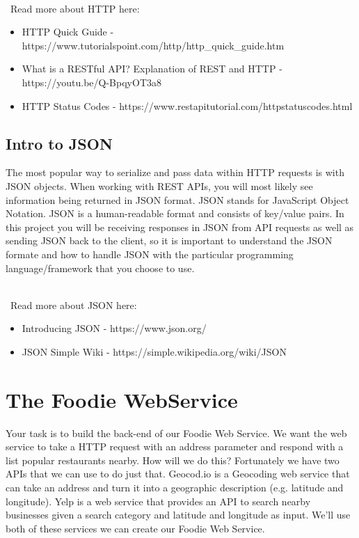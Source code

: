 \documentclass{article}
\begin{document}
\-\\\ Read more about HTTP here:
\begin{itemize}
\item HTTP Quick Guide - https://www.tutorialspoint.com/http/http\_quick\_guide.htm
\item What is a RESTful API? Explanation of REST and HTTP - https://youtu.be/Q-BpqyOT3a8
\item HTTP Status Codes - https://www.restapitutorial.com/httpstatuscodes.html
\end{itemize}

\subsection*{Intro to JSON}
The most popular way to serialize and pass data within HTTP requests is with JSON objects. When working with REST APIs, you will most likely see information being returned in JSON format. JSON stands for JavaScript Object Notation. JSON is a human-readable format and consists of key/value pairs. In this project you will be receiving responses in JSON from API requests as well as sending JSON back to the client, so it is important to understand the JSON formate and how to handle JSON with the particular programming language/framework that you choose to use. 

\-\\\ Read more about JSON here:
\begin{itemize}
\item Introducing JSON - https://www.json.org/
\item JSON Simple Wiki - https://simple.wikipedia.org/wiki/JSON
\end{itemize}


\section*{The Foodie WebService}
Your task is to build the back-end of our Foodie Web Service. We want the web service to take a HTTP request with an address parameter and respond with a list popular restaurants nearby. How will we do this? Fortunately we have two APIs that we can use to do just that. Geocod.io is a Geocoding web service that can take an address and turn it into a geographic description (e.g. latitude and longitude). Yelp is a web service that provides an API to search nearby businesses given a search category and latitude and longitude as input. We'll use both of these services we can create our Foodie Web Service.
\end{document}
